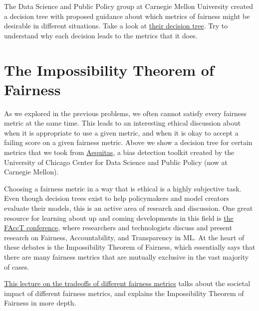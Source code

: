 \documentclass[assignment03_Solutions]{subfiles}
\begin{document}
\begin{exercise}[(60 Minutes)]
\item The Data Science and Public Policy group at Carnegie Mellon University created a decision tree with proposed guidance about which metrics of fairness might be desirable in different situations. Take a look at  \href{http://www.datasciencepublicpolicy.org/wp-content/uploads/2018/05/metrictree-1024x640.png}{their decision tree}. Try to understand why each decision leads to the metrics that it does. 

\ees
\end{exercise}



\section*{The Impossibility Theorem of Fairness}
As we explored in the previous problems, we often cannot satisfy every fairness metric at the same time. This leads to an interesting ethical discussion about when it is appropriate to use a given metric, and when it is okay to accept a failing score on a given fairness metric. Above we show a decision tree for certain metrics that we took from \href{http://www.datasciencepublicpolicy.org/our-work/tools-guides/aequitas/}{Aequitas}, a bias detection toolkit created by the University of Chicago Center for Data Science and Public Policy (now at Carnegie Mellon). 
 
Choosing a fairness metric in a way that is ethical is a highly subjective task. Even though decision trees exist to help policymakers and model creators evaluate their models, this is an active area of research and discussion. One great resource for learning about up and coming developments in this field is \href{https://facctconference.org/}{the FAccT conference}, where researchers and technologists discuss and present research on Fairness, Accountability, and Transparency in ML. At the heart of these debates is the Impossibility Theorem of Fairness, which essentially says that there are many fairness metrics that are mutually exclusive in the vast majority of cases. 

\begin{externalresources}[60 Minutes]
\href{https://www.youtube.com/watch?v=jIXIuYdnyyk}{This lecture on the tradeoffs of different fairness metrics} talks about the societal impact of different fairness metrics, and explains the Impossibility Theorem of Fairness in more depth.
\end{externalresources}
\end{document}
